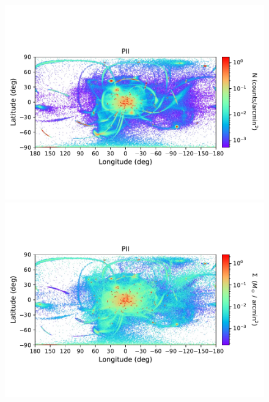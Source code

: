 \begin{figure}[h!]
\begin{center}
            \includegraphics[clip=true, trim = 0mm 20mm 0mm 20mm, width=0.9\columnwidth]{images/PII_ensemble_LB_count_density.pdf}
            \includegraphics[clip=true, trim = 0mm 20mm 0mm 20mm, width=0.9\columnwidth]{images/PII_ensemble_LB_density_mass.pdf}


\end{center}
\end{figure}
